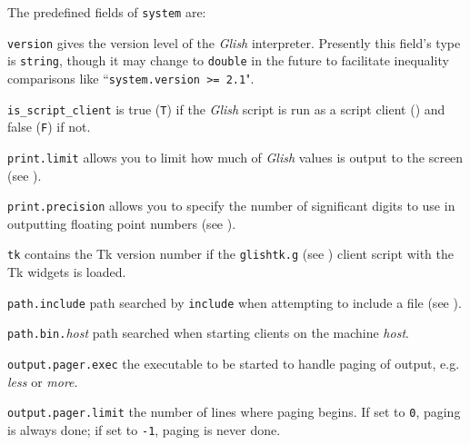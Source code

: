 \begin{sloppy}
\begin{list}{}{}
The predefined fields of {\tt system} are:
\begin{list}{}{}

\item[{\tt version}] 
gives the version level of the {\em Glish} interpreter.  Presently this field's
type is {\tt string}, though it may change to {\tt double} in the future to
facilitate inequality comparisons like ``{\tt system.version >= 2.1}".

\item[{\tt is\_script\_client}]
is true ({\tt T}) if the {\em Glish} script is run as a script client
() and false ({\tt F}) if not.

\item[{\tt print.limit}] allows you to limit how much of 
{\em Glish}
values is output to the screen (see ).

\item[{\tt print.precision}] allows you to specify the number
of significant digits to use in outputting floating point numbers (see
).

\item[{\tt tk}] contains the Tk version number if the {\tt glishtk.g}
(see ) client script with the Tk widgets is loaded.

\item[{\tt path.include}] path searched by {\tt include} when attempting
to include a file (see ).

\item[{\tt path.bin.}{\em host}] path searched when starting clients on
the machine {\em host}.

\item[{\tt output.pager.exec}] the executable to be started to handle
paging of output, e.g. {\em less} or {\em more}.

\item[{\tt output.pager.limit}] the number of lines where paging begins.
If set to {\tt 0}, paging is always done; if set to {\tt -1}, paging is
never done.


\end{list}
\end{list}
\end{sloppy}
